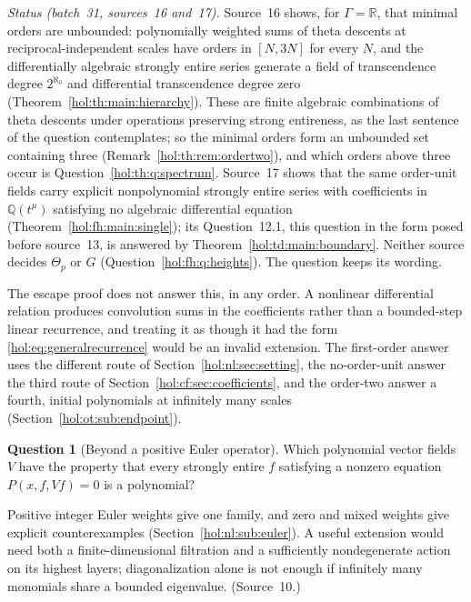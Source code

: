 \documentclass[11pt]{article}
\numberwithin{equation}{section}
\theoremstyle{definition}
\newtheorem{question}[theorem]{Question}
\theoremstyle{remark}
\newcommand{\R}{\mathbb R}
\newcommand{\Q}{\mathbb Q}
\begin{document}
\emph{Status (batch~31, sources~16 and~17).} Source~16 shows, for $\Gamma=\R$,
that minimal orders are unbounded: polynomially weighted sums of theta descents
at reciprocal-independent scales have orders in $[N,3N]$ for every $N$, and the
differentially algebraic strongly entire series generate a field of
transcendence degree $2^{\aleph_0}$ and differential transcendence degree zero
(Theorem~\ref{hol:th:main:hierarchy}). These are finite algebraic combinations
of theta descents under operations preserving strong entireness, as the last
sentence of the question contemplates; so the minimal orders form an unbounded
set containing three (Remark~\ref{hol:th:rem:ordertwo}), and which orders above
three occur is Question~\ref{hol:th:q:spectrum}. Source~17 shows that the same
order-unit fields carry explicit nonpolynomial strongly entire series with
coefficients in $\Q(t^\mu)$ satisfying no algebraic differential equation
(Theorem~\ref{hol:fh:main:single}); its Question~12.1, this question in the
form posed before source~13, is answered by Theorem~\ref{hol:td:main:boundary}.
Neither source decides $\Theta_p$ or $G$ (Question~\ref{hol:fh:q:heights}). The
question keeps its wording.

The escape proof does not answer this, in any order. A nonlinear differential
relation produces convolution sums in the coefficients rather than a
bounded-step linear recurrence, and treating it as though it had the form
\eqref{hol:eq:generalrecurrence} would be an invalid extension. The
first-order answer uses the different route of
Section~\ref{hol:nl:sec:setting}, the no-order-unit answer the third route
of Section~\ref{hol:cf:sec:coefficients}, and the order-two answer a fourth,
initial polynomials at infinitely many scales
(Section~\ref{hol:ot:sub:endpoint}).

\begin{question}[Beyond a positive Euler operator]\label{hol:nl:q:vectorfields}
Which polynomial vector fields $V$ have the property that every strongly
entire $f$ satisfying a nonzero equation $P(x,f,Vf)=0$ is a polynomial?
\end{question}

Positive integer Euler weights give one family, and zero and mixed weights
give explicit counterexamples (Section~\ref{hol:nl:sub:euler}). A useful
extension would need both a finite-dimensional filtration and a sufficiently
nondegenerate action on its highest layers; diagonalization alone is not
enough if infinitely many monomials share a bounded eigenvalue. (Source~10.)
\end{document}
